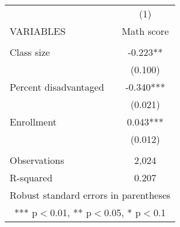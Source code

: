 \documentclass[]{article}
\begin{document}
\begin{tabular}{lc} \hline
 & (1) \\
VARIABLES & Math score \\ \hline
 &  \\
Class size & -0.223** \\
 & (0.100) \\
Percent disadvantaged & -0.340*** \\
 & (0.021) \\
Enrollment & 0.043*** \\
 & (0.012) \\
 &  \\
Observations & 2,024 \\
 R-squared & 0.207 \\ \hline
\multicolumn{2}{c}{ Robust standard errors in parentheses} \\
\multicolumn{2}{c}{ *** p$<$0.01, ** p$<$0.05, * p$<$0.1} \\
\end{tabular}
\end{document}
